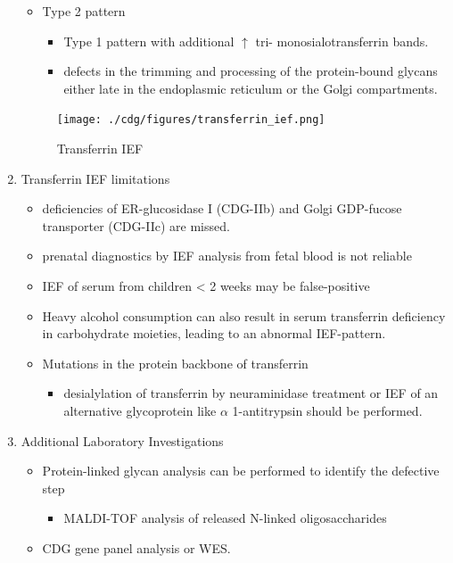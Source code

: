 \documentclass{scrartcl}
\begin{document}
\begin{enumerate}
\begin{itemize}
\item Type 2 pattern

\begin{itemize}
\item Type 1 pattern with additional \(\uparrow\) tri- \textpm{}
monosialotransferrin bands.

\item defects in the trimming and processing of the protein-bound
glycans either late in the endoplasmic reticulum or the Golgi
compartments.
\end{itemize}
\end{itemize}

\begin{figure}[htbp]
\centering
\texttt{[image: ./cdg/figures/transferrin\_ief.png]}
\caption{\label{fig:orgaf3baa1}
Transferrin IEF}
\end{figure}

\item Transferrin IEF limitations
\label{sec:org896a5d0}

\begin{itemize}
\item deficiencies of ER-glucosidase I (CDG-IIb) and Golgi GDP-fucose
transporter (CDG-IIc) are missed.
\item prenatal diagnostics by IEF analysis from fetal blood is not
reliable
\item IEF of serum from children \textless{} 2 weeks may be false-positive
\item Heavy alcohol consumption can also result in serum transferrin
deficiency in carbohydrate moieties, leading to an abnormal
IEF-pattern.
\item Mutations in the protein backbone of transferrin
\begin{itemize}
\item desialylation of transferrin by neuraminidase treatment or IEF of
an alternative glycoprotein like \(\alpha\) 1-antitrypsin should be
performed.
\end{itemize}
\end{itemize}

\item Additional Laboratory Investigations
\label{sec:orgac2a8ec}

\begin{itemize}
\item Protein-linked glycan analysis can be performed to identify the defective step
\begin{itemize}
\item MALDI-TOF analysis of released N-linked oligosaccharides
\end{itemize}
\item CDG gene panel analysis or WES.


\end{itemize}
\end{enumerate}
\end{document}
